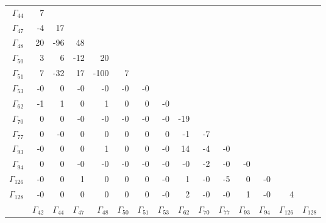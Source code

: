 {\begin{table}
\begin{center}
\begin{minipage}{\linewidth}
\begin{center}
\label{tab:br-fit-corr5}%
\fi
\begin{envsmall}
\begin{center}
\renewcommand*{\arraystretch}{1.1}%
\begin{tabular}{rrrrrrrrrrrrrrr}
\hline
\( \Gamma_{44} \) &    7 &  &  &  &  &  &  &  &  &  &  &  &  &  \\
\( \Gamma_{47} \) &   -4 &   17 &  &  &  &  &  &  &  &  &  &  &  &  \\
\( \Gamma_{48} \) &   20 &  -96 &   48 &  &  &  &  &  &  &  &  &  &  &  \\
\( \Gamma_{50} \) &    3 &    6 &  -12 &   20 &  &  &  &  &  &  &  &  &  &  \\
\( \Gamma_{51} \) &    7 &  -32 &   17 & -100 &    7 &  &  &  &  &  &  &  &  &  \\
\( \Gamma_{53} \) &   -0 &    0 &   -0 &   -0 &   -0 &   -0 &  &  &  &  &  &  &  &  \\
\( \Gamma_{62} \) &   -1 &    1 &    0 &    1 &    0 &    0 &   -0 &  &  &  &  &  &  &  \\
\( \Gamma_{70} \) &    0 &    0 &   -0 &   -0 &   -0 &   -0 &   -0 &  -19 &  &  &  &  &  &  \\
\( \Gamma_{77} \) &    0 &   -0 &    0 &    0 &    0 &    0 &    0 &   -1 &   -7 &  &  &  &  &  \\
\( \Gamma_{93} \) &   -0 &    0 &    0 &    1 &    0 &    0 &   -0 &   14 &   -4 &   -0 &  &  &  &  \\
\( \Gamma_{94} \) &    0 &    0 &   -0 &   -0 &   -0 &   -0 &   -0 &   -0 &   -2 &   -0 &   -0 &  &  &  \\
\( \Gamma_{126} \) &   -0 &    0 &    1 &    0 &    0 &    0 &   -0 &    1 &   -0 &   -5 &    0 &   -0 &  &  \\
\( \Gamma_{128} \) &   -0 &    0 &    0 &    0 &    0 &    0 &   -0 &    2 &   -0 &   -0 &    1 &   -0 &    4 &  \\
 & \( \Gamma_{42} \) & \( \Gamma_{44} \) & \( \Gamma_{47} \) & \( \Gamma_{48} \) & \( \Gamma_{50} \) & \( \Gamma_{51} \) & \( \Gamma_{53} \) & \( \Gamma_{62} \) & \( \Gamma_{70} \) & \( \Gamma_{77} \) & \( \Gamma_{93} \) & \( \Gamma_{94} \) & \( \Gamma_{126} \) & \( \Gamma_{128} \)
\\\hline
\end{tabular}
\end{center}

\end{envsmall}
\end{center}
\end{minipage}
\end{center}
\end{table}}

